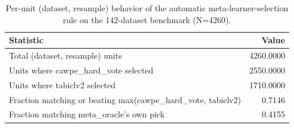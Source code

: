 \begin{table}[t]
\centering
\begin{tabular}{lr}
\toprule
Statistic & Value \\
\midrule
Total (dataset, resample) units & 4260.0000 \\
Units where cawpe\_hard\_vote selected & 2550.0000 \\
Units where tabiclv2 selected & 1710.0000 \\
Fraction matching or beating max(cawpe\_hard\_vote, tabiclv2) & 0.7146 \\
Fraction matching meta\_oracle's own pick & 0.4155 \\
\bottomrule
\end{tabular}
\caption{Per-unit (dataset, resample) behavior of the automatic meta-learner-selection rule on the 142-dataset benchmark (N=4260).}
\label{tab:auto_selected_selection_behavior}
\end{table}